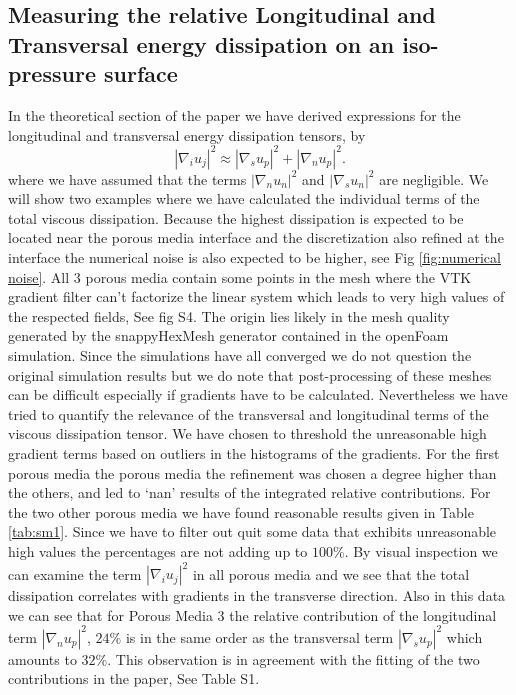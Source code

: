 \documentclass[draft,jgrga]{agutexSI2019}
\begin{document}
\begin{article}
\section{Measuring the relative Longitudinal and Transversal energy dissipation on an iso-pressure surface} 
In the theoretical section of the paper we have derived expressions for the longitudinal and transversal energy dissipation tensors, by 
\begin{equation}\label{eq:reduced_dissipation_tensor}
\left|\nabla_i u_j\right|^2 \approx  \left|\nabla_s u_p\right|^2 + \left|\nabla_n u_p\right|^2 .
\end{equation}
where we have assumed that the terms $ \left|\nabla_n u_n\right|^2$ and $ \left|\nabla_s u_n\right|^2$ are negligible. We will show two examples where we have calculated the individual terms of the total viscous dissipation. Because the highest dissipation is expected to be located near the porous media interface and the discretization also refined at the interface the numerical noise is also expected to be higher, see Fig \ref{fig:numerical noise}. All 3 porous media contain some points in the mesh where the VTK gradient filter can't factorize the linear system which leads to very high values of the respected fields, See fig S4. The origin lies likely in the mesh quality generated by the snappyHexMesh generator contained in the openFoam simulation. Since the simulations have all converged we do not question the original simulation results but we do note that post-processing of these meshes can be difficult especially if gradients have to be calculated. Nevertheless we have tried to quantify the relevance of the transversal and longitudinal terms of the viscous dissipation tensor. We have chosen to threshold the unreasonable high gradient terms based on outliers in the histograms of the gradients. For the first porous media the porous media the refinement was chosen a degree higher than the others, and led to `nan' results of the integrated relative contributions. For the two other porous media we have found reasonable results given in Table \ref{tab:sm1}. Since we have to filter out quit some data that exhibits unreasonable high values the percentages are not adding up to $100\%$. By visual inspection we can examine the term $\left|\nabla_i u_j\right|^2$ in all porous media and we see that the total dissipation correlates with gradients in the transverse direction. Also in this data we can see that for Porous Media 3 the relative contribution of the longitudinal term $ \left|\nabla_n u_p\right|^2$, $24\%$ is in the same order as the transversal term $ \left|\nabla_s u_p\right|^2$ which amounts to $32\%$. This observation is in agreement with the fitting of the two contributions in the paper, See Table S1.


\end{article}
\end{document}
